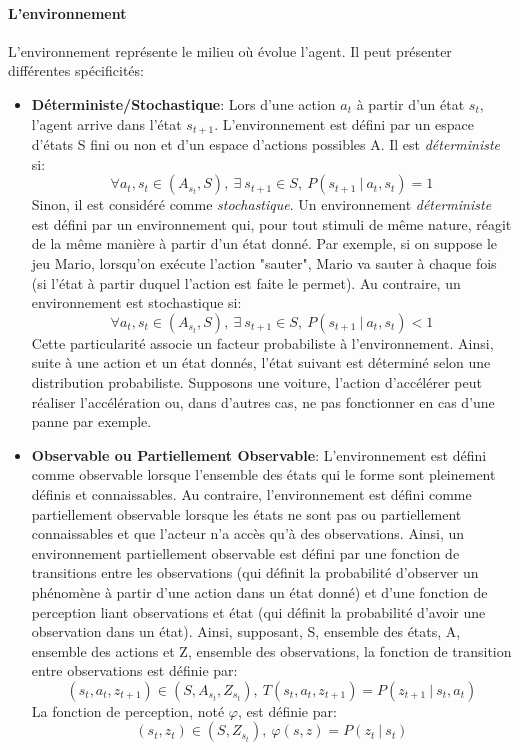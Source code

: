 \paragraph{L'environnement}
L'environnement représente le milieu où évolue l'agent. Il peut présenter différentes spécificités:
\begin{itemize}
    \item \textbf{Déterministe/Stochastique}: Lors d'une action $a_t$ à partir d'un état $s_t$, l'agent arrive dans l'état $s_{t+1}$. L'environnement est défini par un espace d'états S fini ou non et d'un espace d'actions possibles A. Il est \textit{déterministe} si:
    $$\forall a_t,s_t \in (A_{s_t},S), \  \exists \ s_{t+1} \in S, \ P(s_{t+1} \ | \ a_t,s_t)=1$$
    Sinon, il est considéré comme \textit{stochastique}. Un environnement \textit{déterministe} est défini par un environnement qui, pour tout stimuli de même nature, réagit de la même manière à partir d'un état donné. Par exemple, si on suppose le jeu Mario, lorsqu'on exécute l'action "sauter", Mario va sauter à chaque fois (si l'état à partir duquel l'action est faite le permet). Au contraire, un environnement est stochastique si:
    $$\forall a_t,s_t \in (A_{s_t},S), \ \exists \ s_{t+1} \in S, \ P(s_{t+1} \ | \ a_t,s_t)<1$$
    Cette particularité associe un facteur probabiliste à l'environnement. Ainsi, suite à une action et un état donnés, l'état suivant est déterminé selon une distribution probabiliste. Supposons une voiture, l'action d'accélérer peut réaliser l'accélération ou, dans d'autres cas, ne pas fonctionner en cas d'une panne par exemple.

    \item \textbf{Observable ou Partiellement Observable}: L'environnement est défini comme observable lorsque l'ensemble des états qui le forme sont pleinement définis et connaissables. Au contraire, l'environnement est défini comme partiellement observable lorsque les états ne sont pas ou partiellement connaissables et que l'acteur n'a accès qu'à des observations. Ainsi, un environnement partiellement observable est défini par une fonction de transitions entre les observations (qui définit la probabilité d'observer un phénomène à partir d'une action dans un état donné) et d'une fonction de perception liant observations et état (qui définit la probabilité d'avoir une observation dans un état). Ainsi, supposant, S, ensemble des états, A, ensemble des actions et Z, ensemble des observations, la fonction de transition entre observations est définie par:
    $$(s_t,a_t,z_{t+1}) \in (S,A_{s_t},Z_{s_t}), \ T(s_t,a_t,z_{t+1})=P(z_{t+1} \ | \ s_t, a_t)$$
    La fonction de perception, noté $\varphi$, est définie par:
    $$(s_t,z_t) \in (S,Z_{s_t}), \ \varphi(s,z)=P(z_t \ | \ s_t)$$


\end{itemize}
